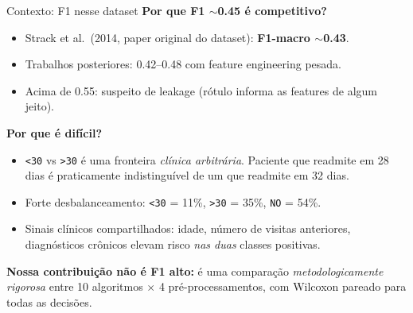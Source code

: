 \documentclass[aspectratio=169]{beamer}
\begin{document}
\begin{frame}{Contexto: F1 nesse dataset}
\textbf{Por que F1 $\sim$0.45 é competitivo?}

\vspace{0.5em}
\begin{itemize}
  \item Strack et al.\ (2014, paper original do dataset): \textbf{F1-macro $\sim$0.43}.
  \item Trabalhos posteriores: 0.42--0.48 com feature engineering pesada.
  \item Acima de 0.55: \alert{suspeito de leakage} (rótulo informa as features de algum jeito).
\end{itemize}

\vspace{0.6em}
\textbf{Por que é difícil?}
\begin{itemize}
  \item \texttt{<30} vs \texttt{>30} é uma fronteira \emph{clínica arbitrária}. Paciente que readmite em 28 dias é praticamente indistinguível de um que readmite em 32 dias.
  \item Forte desbalanceamento: \texttt{<30} = 11\%, \texttt{>30} = 35\%, \texttt{NO} = 54\%.
  \item Sinais clínicos compartilhados: idade, número de visitas anteriores, diagnósticos crônicos elevam risco \emph{nas duas} classes positivas.
\end{itemize}

\vspace{0.5em}
\textbf{Nossa contribuição não é F1 alto:} é uma comparação \emph{metodologicamente rigorosa} entre 10 algoritmos $\times$ 4 pré-processamentos, com Wilcoxon pareado para todas as decisões.
\end{frame}
\end{document}
